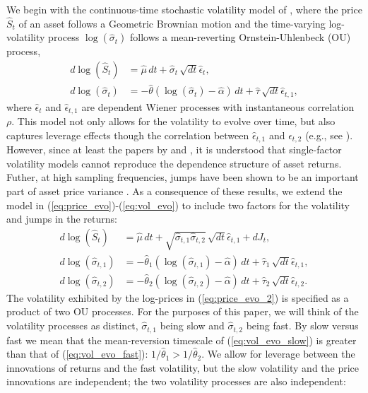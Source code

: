 \documentclass[10pt]{article}
\begin{document}
We begin with the continuous-time stochastic volatility model of \cite{hull1987pricing}, where the price $\hat{S}_t$ of an asset follows a Geometric Brownian motion and the time-varying log-volatility process $\log(\hat{\sigma}_t)$ follows a mean-reverting Ornstein-Uhlenbeck (OU) process,
\begin{align}
  d\log(\hat{S}_t) &= \hat{\mu}\, dt + \hat{\sigma}_t\, \sqrt{dt} \hat{\epsilon}_{t}  ,  \label{eq:price_evo} \\
  d\log( \hat{ \sigma }_t) &= -\hat{\theta} ( \log(\hat{\sigma}_t ) - \hat{\alpha} )\, dt + \hat{\tau}\, \sqrt{dt} \hat{\epsilon}_{t,1}  ,  \label{eq:vol_evo}
\end{align}
where $\hat{\epsilon}_{t}$ and $\hat{\epsilon}_{t,1}$ are dependent Wiener processes with instantaneous correlation $\rho$.  This model not only allows for the volatility to evolve over time, but also captures leverage effects though the correlation between $\hat{\epsilon}_{t,1}$ and $\hat{\epsilon}_{t,2}$ (e.g., see \citealp{black1976pricing}). However, since at least the papers by \cite{barndorff2001multifactor} and \cite{chernov2003alternative}, it is understood that single-factor volatility models cannot reproduce the dependence structure of asset returns. Futher, at high sampling frequencies, jumps have been shown to be an important part of asset price variance \citep{huang2005relative}. As a consequence of these results, we extend the model in (\ref{eq:price_evo})-(\ref{eq:vol_evo}) to include two factors for the volatility and jumps in the returns:
\begin{align}
  d\log(\hat{S}_t) &= \hat{\mu}\, dt + \sqrt{\hat{\sigma}_{t,1} \hat{\sigma}_{t,2}}\, \sqrt{dt} \hat{\epsilon}_{t,1} + dJ_t  ,   \label{eq:price_evo_2}\\
  d\log( \hat{ \sigma }_{t,1}) &= -\hat{\theta}_1 ( \log(\hat{\sigma}_{t,1} ) - \hat{\alpha} )\, dt + \hat{\tau}_1\, \sqrt{dt} \hat{\epsilon}_{t,1}  , \label{eq:vol_evo_slow} \\
  d\log( \hat{ \sigma }_{t,2}) &= -\hat{\theta}_2 ( \log(\hat{\sigma}_{t,2} ) - \hat{\alpha} )\, dt + \hat{\tau}_2\, \sqrt{dt} \hat{\epsilon}_{t,2}  . \label{eq:vol_evo_fast}
\end{align}
The volatility exhibited by the log-prices in (\ref{eq:price_evo_2}) is specified as a product of two OU processes. For the purposes of this paper, we will think of the volatility processes as distinct, $\hat{\sigma}_{t,1}$ being slow and $\hat{\sigma}_{t,2}$ being fast. By slow versus fast we mean that the mean-reversion timescale of (\ref{eq:vol_evo_slow}) is greater than that of (\ref{eq:vol_evo_fast}): $1/\hat{\theta}_1 > 1/\hat{\theta}_2$. We allow for leverage between the innovations of returns and the fast volatility, but the slow volatility and the price innovations are independent; the two volatility processes are also independent:
\end{document}
